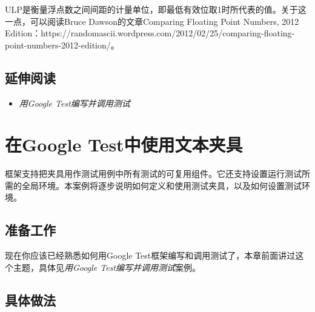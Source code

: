 
\begin{myNote}[tip]
ULP是衡量浮点数之间间距的计量单位，即最低有效位取1时所代表的值。关于这一点，可以阅读Bruce Dawson的文章Comparing Floating Point Numbers, 2012 Edition：https://\allowbreak{}randomascii.\allowbreak{}wordpress.\allowbreak{}com/\allowbreak{}2012/\allowbreak{}02/\allowbreak{}25/\allowbreak{}comparing-\allowbreak{}floating-\allowbreak{}point-\allowbreak{}numbers-\allowbreak{}2012-\allowbreak{}edition/\allowbreak{}。
\end{myNote}



\subsection{延伸阅读}



\begin{itemize}
\item \textit{用Google Test编写并调用测试}

\end{itemize}



\section{在Google Test中使用文本夹具}



框架支持把夹具用作测试用例中所有测试的可复用组件。它还支持设置运行测试所需的全局环境。本案例将逐步说明如何定义和使用测试夹具，以及如何设置测试环境。



\subsection{准备工作}



现在你应该已经熟悉如何用Google Test框架编写和调用测试了，本章前面讲过这个主题，具体见\textit{用Google Test编写}\textit{并调用测试}案例。



\subsection{具体做法}



